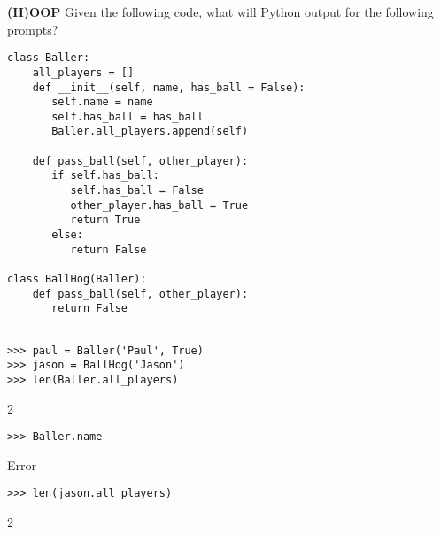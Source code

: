 \begin{blocksection}
\question \textbf{(H)OOP} \newline
Given the following code, what will Python output for the following prompts? 

\begin{lstlisting}
class Baller:
    all_players = []
    def __init__(self, name, has_ball = False):
       self.name = name
       self.has_ball = has_ball
       Baller.all_players.append(self)
    
    def pass_ball(self, other_player):
       if self.has_ball:
          self.has_ball = False
          other_player.has_ball = True
          return True
       else:
          return False

class BallHog(Baller):
    def pass_ball(self, other_player):  
       return False 
       
\end{lstlisting}
\end{blocksection}

\begin{blocksection}

\begin{lstlisting}
>>> paul = Baller('Paul', True)
>>> jason = BallHog('Jason')
>>> len(Baller.all_players)
\end{lstlisting}
\begin{solution}[.2in]
2
\end{solution}

\begin{lstlisting}
>>> Baller.name
\end{lstlisting}
\begin{solution}[.2in]
Error
\end{solution}

\begin{lstlisting}
>>> len(jason.all_players)
\end{lstlisting}
\begin{solution}[.2in]
2
\end{solution}
\end{blocksection}

